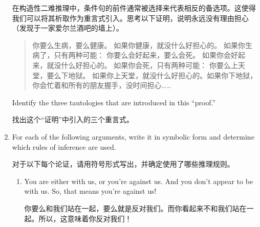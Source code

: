 \begin{enumerate}
    在构造性二难推理中，条件句的前件通常被选择来代表相反的备选项。这使得我们可以将其析取作为重言式引入。思考以下证明，说明永远没有理由担心（发现于一家爱尔兰酒吧的墙上）。
    \begin{quote}
    你要么生病，要么健康。\newline
    如果你健康，就没什么好担心的。\newline
    如果你生病了，只有两种可能：\newline
    你要么会好起来，要么会死。\newline
    如果你会好起来，就没什么好担心的。\newline
    如果你会死，只有两种可能：\newline
    你要么上天堂，要么下地狱。\newline
    如果你上天堂，就没什么好担心的。如果你下地狱，你会忙着和所有的朋友握手，没时间担心……
    \end{quote}
    
    Identify the three tautologies that are introduced in this ``proof.''
    
    找出这个“证明”中引入的三个重言式。
    
    
    \textbookpagebreak
    
    \item For each of the following arguments, write it in symbolic form and determine 
    which rules of inference are used.
    
    对于以下每个论证，请用符号形式写出，并确定使用了哪些推理规则。
    \begin{enumerate}
    \item \rule{0pt}{24pt} You are either with us, or you're against us.  And you don't appear to be with us.
    So, that means you're against us!
    
    你要么和我们站在一起，要么就是反对我们。而你看起来不和我们站在一起。所以，这意味着你反对我们！
    
\end{enumerate}
\end{enumerate}
